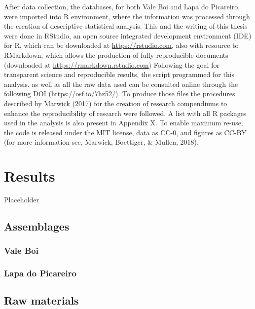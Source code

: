 \documentclass[12pt,twoside]{reedthesis}
\begin{document}
After data collection, the databases, for both Vale Boi and Lapa do Picareiro, were imported into R environment, where the information was processed through the creation of descriptive statistical analysis. This and the writing of this thesis were done in RStudio, an open source integrated development environment (IDE) for R, which can be downloaded at \url{https://rstudio.com}, also with resource to RMarkdown, which allows the production of fully reproducible documents (downloaded at \url{https://rmarkdown.rstudio.com}) Following the goal for transparent science and reproducible results, the script programmed for this analysis, as well as all the raw data used can be consulted online through the following DOI (\url{https://osf.io/7hz52/}). To produce those files the procedures described by Marwick (2017) for the creation of research compendiums to enhance the reproducibility of research were followed. A list with all R packages used in the analysis is also present in Appendix X. To enable maximum re-use, the code is released under the MIT license, data as CC-0, and figures as CC-BY (for more information see, Marwick, Boettiger, \& Mullen, 2018).

\hypertarget{results}{%
\chapter{Results}\label{results}}

Placeholder

\hypertarget{assemblages}{%
\section{Assemblages}\label{assemblages}}

\hypertarget{vale-boi-2}{%
\subsection{Vale Boi}\label{vale-boi-2}}

\hypertarget{lapa-do-picareiro-2}{%
\subsection{Lapa do Picareiro}\label{lapa-do-picareiro-2}}

\hypertarget{raw-materials}{%
\section{Raw materials}\label{raw-materials}}
\end{document}
